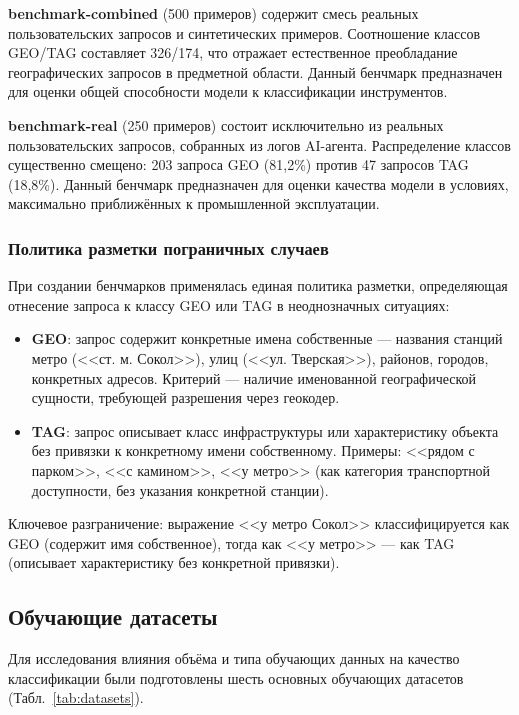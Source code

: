 \textbf{benchmark-combined} (500 примеров) содержит смесь реальных пользовательских запросов и синтетических примеров. Соотношение классов GEO/TAG составляет 326/174, что отражает естественное преобладание географических запросов в предметной области. Данный бенчмарк предназначен для оценки общей способности модели к классификации инструментов.

\textbf{benchmark-real} (250 примеров) состоит исключительно из реальных пользовательских запросов, собранных из логов AI-агента. Распределение классов существенно смещено: 203 запроса GEO (81,2\%) против 47 запросов TAG (18,8\%). Данный бенчмарк предназначен для оценки качества модели в условиях, максимально приближённых к промышленной эксплуатации.

\subsubsection{Политика разметки пограничных случаев}

При создании бенчмарков применялась единая политика разметки, определяющая отнесение запроса к классу GEO или TAG в неоднозначных ситуациях:
\begin{itemize}
    \item \textbf{GEO}: запрос содержит конкретные имена собственные --- названия станций метро (<<ст. м. Сокол>>), улиц (<<ул. Тверская>>), районов, городов, конкретных адресов. Критерий --- наличие именованной географической сущности, требующей разрешения через геокодер.
    \item \textbf{TAG}: запрос описывает класс инфраструктуры или характеристику объекта без привязки к конкретному имени собственному. Примеры: <<рядом с парком>>, <<с камином>>, <<у метро>> (как категория транспортной доступности, без указания конкретной станции).
\end{itemize}

\noindent Ключевое разграничение: выражение <<у метро Сокол>> классифицируется как GEO (содержит имя собственное), тогда как <<у метро>> --- как TAG (описывает характеристику без конкретной привязки).

\subsection{Обучающие датасеты} \label{subsec:datasets}

Для исследования влияния объёма и типа обучающих данных на качество классификации были подготовлены шесть основных обучающих датасетов (Табл.~\ref{tab:datasets}).

